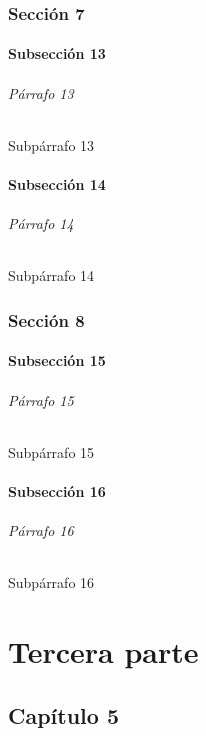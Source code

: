 \documentclass[11pt,a4paper]{book}
\begin{document}
      \section{Sección 7}
       \subsection{Subsección 13}
       \lipsum[1]
       \paragraph{Párrafo 13 }
       \lipsum[2] 
       \subparagraph{Subpárrafo 13} 
       \lipsum[4] 
       \subsection{Subsección 14}
       \lipsum[1]
       \paragraph{Párrafo 14 }
       \lipsum[2] 
       \subparagraph{Subpárrafo 14} 
       \lipsum[4] 
      \section{Sección 8}
       \subsection{Subsección 15}
       \lipsum[1]
       \paragraph{Párrafo 15 }
       \lipsum[2] 
       \subparagraph{Subpárrafo 15} 
       \lipsum[4] 
       \subsection{Subsección 16}
       \lipsum[1]
       \paragraph{Párrafo 16 }
       \lipsum[2] 
       \subparagraph{Subpárrafo 16} 
       \lipsum[4] 
    \part{Tercera parte}
     \chapter{Capítulo 5}
\end{document}
